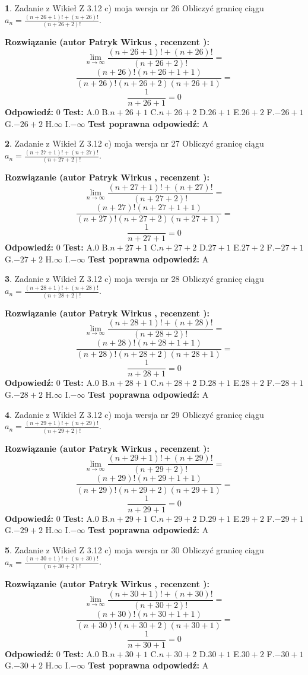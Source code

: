 \documentclass[12pt, a4paper]{article}
\theoremstyle{definition} %
\newtheorem{zad}{}
\newcommand{\zadStart}[1]{\begin{zad}#1\newline}
\newcommand{\zadStop}{\end{zad}}
\newcommand{\rozwStart}[2]{\noindent \textbf{Rozwiązanie (autor #1 , recenzent #2): }\newline}
\newcommand{\rozwStop}{\newline}
\newcommand{\odpStart}{\noindent \textbf{Odpowiedź:}\newline}
\newcommand{\odpStop}{\newline}
\newcommand{\testStart}{\noindent \textbf{Test:}\newline}
\newcommand{\testStop}{\newline}
\newcommand{\kluczStart}{\noindent \textbf{Test poprawna odpowiedź:}\newline}
\newcommand{\kluczStop}{\newline}
\begin{document}
\zadStart{Zadanie z Wikieł Z 3.12 c) moja wersja nr 26}
Obliczyć granicę ciągu $a_{n}=\frac{(n+26+1)!+(n+26)!}{(n+26+2)!}$.
\zadStop
\rozwStart{Patryk Wirkus}{}
$$\lim\limits_{n\to\infty}\frac{(n+26+1)!+(n+26)!}{(n+26+2)!}=$$
$$\frac{(n+26)!(n+26+1+1)}{(n+26)!(n+26+2)(n+26+1)}=$$
$$\frac{1}{n+26+1}= 0$$
\rozwStop
\odpStart
$0$
\odpStop
\testStart
A.$0$
B.$n+26+1$
C.$n+26+2$
D.$26+1$
E.$26+2$
F.$-26+1$
G.$-26+2$
H.$\infty$
I.$-\infty$
\testStop
\kluczStart
A
\kluczStop



\zadStart{Zadanie z Wikieł Z 3.12 c) moja wersja nr 27}
Obliczyć granicę ciągu $a_{n}=\frac{(n+27+1)!+(n+27)!}{(n+27+2)!}$.
\zadStop
\rozwStart{Patryk Wirkus}{}
$$\lim\limits_{n\to\infty}\frac{(n+27+1)!+(n+27)!}{(n+27+2)!}=$$
$$\frac{(n+27)!(n+27+1+1)}{(n+27)!(n+27+2)(n+27+1)}=$$
$$\frac{1}{n+27+1}= 0$$
\rozwStop
\odpStart
$0$
\odpStop
\testStart
A.$0$
B.$n+27+1$
C.$n+27+2$
D.$27+1$
E.$27+2$
F.$-27+1$
G.$-27+2$
H.$\infty$
I.$-\infty$
\testStop
\kluczStart
A
\kluczStop



\zadStart{Zadanie z Wikieł Z 3.12 c) moja wersja nr 28}
Obliczyć granicę ciągu $a_{n}=\frac{(n+28+1)!+(n+28)!}{(n+28+2)!}$.
\zadStop
\rozwStart{Patryk Wirkus}{}
$$\lim\limits_{n\to\infty}\frac{(n+28+1)!+(n+28)!}{(n+28+2)!}=$$
$$\frac{(n+28)!(n+28+1+1)}{(n+28)!(n+28+2)(n+28+1)}=$$
$$\frac{1}{n+28+1}= 0$$
\rozwStop
\odpStart
$0$
\odpStop
\testStart
A.$0$
B.$n+28+1$
C.$n+28+2$
D.$28+1$
E.$28+2$
F.$-28+1$
G.$-28+2$
H.$\infty$
I.$-\infty$
\testStop
\kluczStart
A
\kluczStop



\zadStart{Zadanie z Wikieł Z 3.12 c) moja wersja nr 29}
Obliczyć granicę ciągu $a_{n}=\frac{(n+29+1)!+(n+29)!}{(n+29+2)!}$.
\zadStop
\rozwStart{Patryk Wirkus}{}
$$\lim\limits_{n\to\infty}\frac{(n+29+1)!+(n+29)!}{(n+29+2)!}=$$
$$\frac{(n+29)!(n+29+1+1)}{(n+29)!(n+29+2)(n+29+1)}=$$
$$\frac{1}{n+29+1}= 0$$
\rozwStop
\odpStart
$0$
\odpStop
\testStart
A.$0$
B.$n+29+1$
C.$n+29+2$
D.$29+1$
E.$29+2$
F.$-29+1$
G.$-29+2$
H.$\infty$
I.$-\infty$
\testStop
\kluczStart
A
\kluczStop



\zadStart{Zadanie z Wikieł Z 3.12 c) moja wersja nr 30}
Obliczyć granicę ciągu $a_{n}=\frac{(n+30+1)!+(n+30)!}{(n+30+2)!}$.
\zadStop
\rozwStart{Patryk Wirkus}{}
$$\lim\limits_{n\to\infty}\frac{(n+30+1)!+(n+30)!}{(n+30+2)!}=$$
$$\frac{(n+30)!(n+30+1+1)}{(n+30)!(n+30+2)(n+30+1)}=$$
$$\frac{1}{n+30+1}= 0$$
\rozwStop
\odpStart
$0$
\odpStop
\testStart
A.$0$
B.$n+30+1$
C.$n+30+2$
D.$30+1$
E.$30+2$
F.$-30+1$
G.$-30+2$
H.$\infty$
I.$-\infty$
\testStop
\kluczStart
A
\kluczStop
\end{document}
